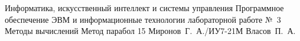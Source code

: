 \documentclass{bmstu}
\begin{document}
\makereporttitle
    {Информатика, искусственный интеллект и системы управления}
    {Программное обеспечение ЭВМ и информационные технологии}
    {лабораторной работе №~3}
    {Методы вычислений}
    {Метод парабол}
    {15}
    {Миронов~Г.~А./ИУ7-21М}
    {Власов~П.~А.}


\end{document}
